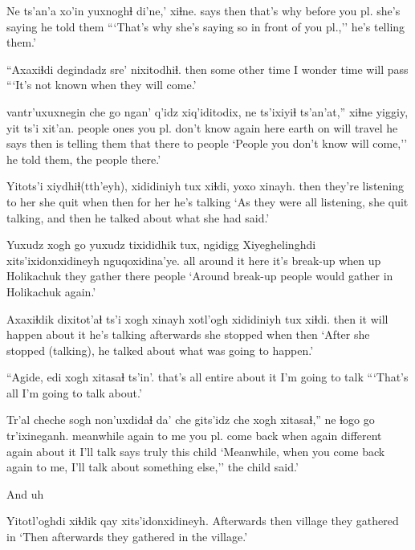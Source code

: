 \documentclass[12pt]{article}
\begin{document}
\gll Ne ts'an'a xo'in yuxnoghɬ di'ne,' xiɬne.
says  then {that's why}   {before you pl.} {she's saying} {he told them}
\glt ```That's why she's saying so in front of you pl.,'' he's telling them.'
\glend

\gll ``Axaxiɬdi degindadz       sre'     nixitodhiɬ.
then   {some other time}  {I wonder} {time will pass}
\glt ```It's not known when they will come.'
\glend

 vantr'uxuxnegin         che   go   ngan' q'idz xiq'iditodix, ne      ts'ixiyiɬ  ts'an'at,'' xiɬne           yiggiy, yit   ts'i xit'an.
people            {ones you pl. don't know} again      here earth on   {will travel} {he says} then     {}       {is telling them} that      there to  {people}
\glt `People you don't know will come,'' he told them, the people there.' 
\glend

\gll Yitots'i xiydhiɬ(tth'eyh), xididiniyh tux xiɬdi, yoxo    xinayh.
then           {they're listening to her} {she quit} when  then  {for her} {he's talking}
\glt `As they were all listening, she quit talking, and then he talked about what she had said.'
\glend

\gll Yuxudz xogh go yuxudz   tixididhik    tux, ngidigg Xiyeghelinghdi xits'ixidonxidineyh nguqoxidina'ye. 
all    {around it} here {} {it's break-up} when up      Holikachuk       {they gather there}    people
\glt `Around break-up people would gather in Holikachuk again.'
\glend

\gll Axaxiɬdik dixitot'aɬ ts'i xogh xinayh xotl'ogh        xididiniyh tux     xiɬdi. 
then    {it will happen} {} {about it}  {he's talking} afterwards {she stopped} when        then
\glt `After she stopped (talking), he talked about what was going to happen.'
\glend

\gll ``Agide,      edi xogh xitasaɬ ts'in'.
{that's all} entire {about it} {I'm going to talk}
\glt ```That's all I'm going to talk about.'
\glend

\gll Tr'al  cheche sogh  non'uxdidaɬ       da' che   gits'idz  che   xogh xitasaɬ,''       ne   ɬogo go tr'ixineganh.
meanwhile again  {to me} {you pl. come back} when again different again {about it} {I'll talk} says truly  this child
\glt `Meanwhile, when you come back again to me, I'll talk about something else,'' the child said.'
\glend

And uh

\gll Yitotl'oghdi xiɬdik qay xits'idonxidineyh.
Afterwards then     village {they gathered in}
\glt `Then afterwards they gathered in the village.'
\glend
\end{document}
